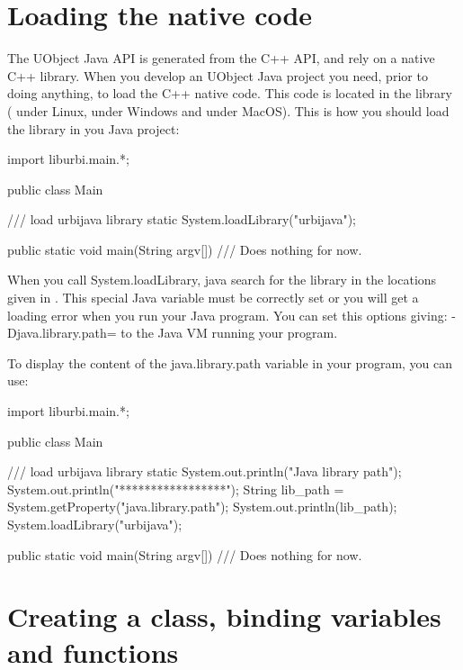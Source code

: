 \section{Loading the native code}

The UObject Java API is generated from the C++ API, and rely on a native
C++ library. When you develop an UObject Java project you need, prior
to doing anything, to load the C++ native code. This code is located
in the  library ( under Linux, 
under Windows and  under MacOS).
This is how you should load the library in you Java project:

\begin{cxx}
import liburbi.main.*;

public class Main {

    /// load urbijava library
    static {
        System.loadLibrary("urbijava");
    }

    public static void main(String argv[]) {
      /// Does nothing for now.
    }
}
\end{cxx}

When you call System.loadLibrary, java search for the library in the locations given
in . This special Java variable must be correctly set or you
will get a loading error when you run your Java program.
You can set this options giving: -Djava.library.path=
to the Java VM running your program.

To display the content of the java.library.path variable in your program, you
can use:

\begin{cxx}
import liburbi.main.*;

public class Main {

    /// load urbijava library
    static {
        System.out.println("Java library path");
        System.out.println("*****************");
        String lib_path = System.getProperty("java.library.path");
        System.out.println(lib_path);
        System.loadLibrary("urbijava");
    }

    public static void main(String argv[]) {
      /// Does nothing for now.
    }
}
\end{cxx}

\section{Creating a class, binding variables and functions}
\label{sec:uob:apijava:bind}

